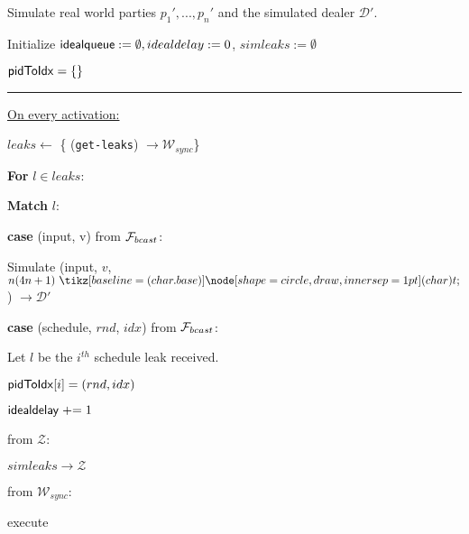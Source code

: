 
\begin{bbox}[title={Simulator $\mathcal{S}_{bracha} (\mathcal{D}, \mathcal{P}, \Delta)$}]

Simulate real world parties $p_1',...,p_n'$ and the simulated dealer $\mathcal{D}'$.

Initialize ${\mathsf {idealqueue}} := \emptyset, idealdelay := 0$, $simleaks := \emptyset$

${\mathsf {pidToIdx}} = \{\}$

\vspace{2mm} \hrule \vspace{2mm}

\underline{On every activation:} \vspace{2mm}

\begin{renumerate}
	\item $leaks \leftarrow$ \{ \Send (\texttt{get-leaks}) $\rightarrow \mathcal{W}_{sync}$\}
	
	\item {\bf For} $l \in leaks$:
		\begin{renumerate}
		\item {\bf Match} $l$:
			\begin{renumerate}
				\item {\bf case} (input, v) from $\mathcal{F}_{bcast}$:

					\quad Simulate (input, $v$, $n(4n+1) \token$) $\rightarrow \mathcal{D}'$ 

				\item {\bf case} (schedule, $rnd$, $idx$) from $\mathcal{F}_{bcast}$:

					\quad Let $l$ be the $i^{th}$ schedule leak received.

					\quad ${\mathsf {pidToIdx}}[i] = (rnd, idx)$

					\quad ${\mathsf {idealdelay}} \mathrel{+}= 1$
			\end{renumerate}
		\end{renumerate}
	\end{renumerate}


\OnInput {} from $\mathcal{Z}$:
	\begin{renumerate}
	\item \Send $simleaks \rightarrow \mathcal{Z}$
	\end{renumerate}

\OnInput {} from $\mathcal{W}_{sync}$:
	\begin{renumerate}
	\item execute \msf{Poll}
	\end{renumerate}


\end{bbox}
